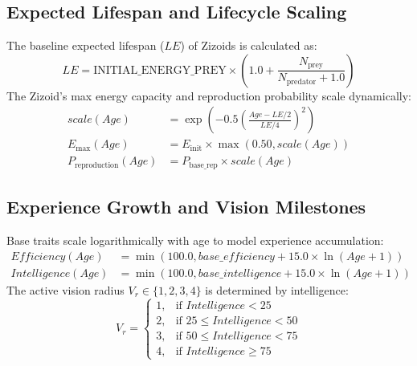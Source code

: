 \documentclass[11pt,a4paper]{article}
\begin{document}
\subsection{Expected Lifespan and Lifecycle Scaling}
The baseline expected lifespan ($LE$) of Zizoids is calculated as:
\begin{equation}
    LE = \text{INITIAL\_ENERGY\_PREY} \times \left(1.0 + \frac{N_{\text{prey}}}{N_{\text{predator}} + 1.0}\right)
\end{equation}
The Zizoid’s max energy capacity and reproduction probability scale dynamically:
\begin{align}
    scale(Age) &= \exp\left( -0.5 \left( \frac{Age - LE/2}{LE/4} \right)^2 \right) \\
    E_{\text{max}}(Age) &= E_{\text{init}} \times \max(0.50, scale(Age)) \\
    P_{\text{reproduction}}(Age) &= P_{\text{base\_rep}} \times scale(Age)
\end{align}

\subsection{Experience Growth and Vision Milestones}
Base traits scale logarithmically with age to model experience accumulation:
\begin{align}
    Efficiency(Age) &= \min(100.0, base\_efficiency + 15.0 \times \ln(Age + 1)) \\
    Intelligence(Age) &= \min(100.0, base\_intelligence + 15.0 \times \ln(Age + 1))
\end{align}
The active vision radius $V_r \in \{1, 2, 3, 4\}$ is determined by intelligence:
\begin{equation}
    V_r = \begin{cases}
        1, & \text{if } Intelligence < 25 \\
        2, & \text{if } 25 \le Intelligence < 50 \\
        3, & \text{if } 50 \le Intelligence < 75 \\
        4, & \text{if } Intelligence \ge 75
    \end{cases}
\end{equation}
\end{document}
